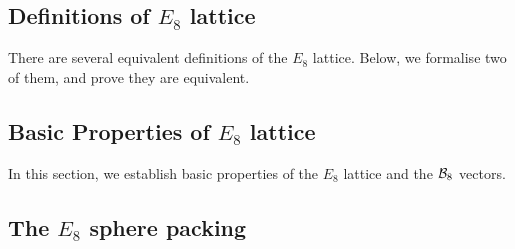 \subsection{Definitions of $E_8$ lattice}

There are several equivalent definitions of the $E_8$ lattice. Below, we formalise two of them, and prove they are equivalent.





\subsection{Basic Properties of $E_8$ lattice}

In this section, we establish basic properties of the $E_8$ lattice and the $\mathcal{B}_8$ vectors.












\subsection{The $E_8$ sphere packing}




